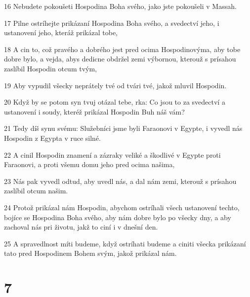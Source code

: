 \par 16 Nebudete pokoušeti Hospodina Boha svého, jako jste pokoušeli v Massah.
\par 17 Pilne ostríhejte prikázaní Hospodina Boha svého, a svedectví jeho, i ustanovení jeho, kteráž prikázal tobe,
\par 18 A cin to, což pravého a dobrého jest pred ocima Hospodinovýma, aby tobe dobre bylo, a vejda, abys dedicne obdržel zemi výbornou, kterouž s prísahou zaslíbil Hospodin otcum tvým,
\par 19 Aby vypudil všecky neprátely tvé od tvári tvé, jakož mluvil Hospodin.
\par 20 Když by se potom syn tvuj otázal tebe, rka: Co jsou to za svedectví a ustanovení i soudy, kteréž prikázal Hospodin Buh náš vám?
\par 21 Tedy díš synu svému: Služebníci jsme byli Faraonovi v Egypte, i vyvedl nás Hospodin z Egypta v ruce silné.
\par 22 A cinil Hospodin znamení a zázraky veliké a škodlivé v Egypte proti Faraonovi, a proti všemu domu jeho pred ocima našima,
\par 23 Nás pak vyvedl odtud, aby uvedl nás, a dal nám zemi, kterouž s prísahou zaslíbil otcum našim.
\par 24 Protož prikázal nám Hospodin, abychom ostríhali všech ustanovení techto, bojíce se Hospodina Boha svého, aby nám dobre bylo po všecky dny, a aby zachoval nás pri životu, jakž to ciní i v dnešní den.
\par 25 A spravedlnost míti budeme, když ostríhati budeme a ciniti všecka prikázaní tato pred Hospodinem Bohem svým, jakož prikázal nám.

\chapter{7}

